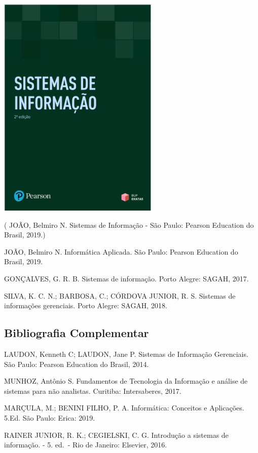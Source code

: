 \documentclass[
]{book}
\begin{document}
\includegraphics[width=3.03125in,height=\textheight]{images/livros/livro-SistemasDeInformação-BelmiroNascimentoJoao-2ed-person.jpg}

( JOÃO, Belmiro N. Sistemas de Informação - São Paulo: Pearson Education do Brasil, 2019.)

JOÃO, Belmiro N. Informática Aplicada. São Paulo: Pearson Education do Brasil, 2019.

GONÇALVES, G. R. B. Sistemas de informação. Porto Alegre: SAGAH, 2017.

SILVA, K. C. N.; BARBOSA, C.; CÓRDOVA JUNIOR, R. S. Sistemas de informações gerenciais. Porto Alegre: SAGAH, 2018.

\subsection{Bibliografia Complementar}\label{bibliografia-complementar}

LAUDON, Kenneth C; LAUDON, Jane P. Sistemas de Informação Gerenciais. São Paulo: Pearson Education do Brasil, 2014.

MUNHOZ, Antônio S. Fundamentos de Tecnologia da Informação e análise de sistemas para não analistas. Curitiba: Intersaberes, 2017.

MARÇULA, M.; BENINI FILHO, P. A. Informática: Conceitos e Aplicações. 5.Ed. São Paulo: Erica: 2019.

RAINER JUNIOR, R. K.; CEGIELSKI, C. G. Introdução a sistemas de informação. - 5. ed.~- Rio de Janeiro: Elsevier, 2016.
\end{document}
